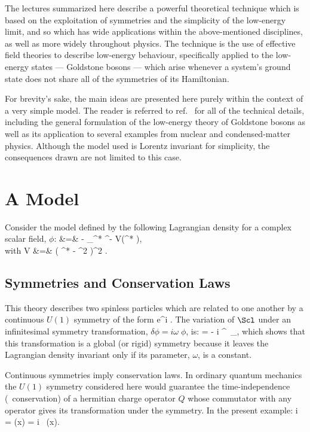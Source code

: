 The lectures summarized here describe a powerful theoretical 
technique which is based on the exploitation of symmetries 
and the simplicity of the low-energy limit, and so which has 
wide applications within the above-mentioned disciplines, as 
well as more widely throughout physics. The technique is the
use of effective field theories to describe low-energy behaviour,
specifically applied to the low-energy states --- Goldstone 
bosons --- which arise whenever a system's ground state
does not share all of the symmetries of its Hamiltonian.

For brevity's sake, the main ideas are presented here purely
within the context of a very simple model. The reader is
referred to ref.~\cite{Burgess98a} for all of the technical
details, including the general formulation of the low-energy
theory of Goldstone bosons as well as its application to
several examples from nuclear and condensed-matter physics. 
Although the model used is Lorentz invariant for simplicity,
the consequences drawn are not limited to this case.

\section{A Model}

Consider the model defined by the following Lagrangian density
for a complex scalar field, $\phi$:
%
\bg
\label{abeltoymodel}
\Scl &=& - \partial_\mu \phi^* \partial^\mu \phi - V(\phi^* \phi), \nn\\
\hbox{with} \qquad V &=& {\lambda {}} \; \left( \phi^* \phi - {\mu^2
\over \lambda} \right)^2 .
\nd

\subsection{Symmetries and Conservation Laws}

This theory describes two spinless particles which are related to
one another by a continuous $U(1)$ symmetry of the form 
%
\bg
\label{U1form}
\phi \to e^{i\omega} \; \phi. 
\nd 
%
The variation of $\Scl$ 
under an infinitesimal symmetry transformation, $\delta \phi
= i \omega \; \phi$,  is:
%
\bg
\label{deltaL}
\delta \Scl = - i \partial^\mu \phi \, \partial_\mu \omega, 
\nd
%
which shows that this transformation is a global
(or rigid) symmetry because it leaves the Lagrangian density 
invariant only if its parameter, $\omega$, is a constant. 

Continuous symmetries imply conservation laws. In ordinary
quantum mechanics the $U(1)$ symmetry considered here
would guarantee the time-independence (\ie\ conservation) 
of a hermitian charge operator $Q$ whose commutator with any operator
gives its transformation under the symmetry. In the present example:
%
\bg
\label{generator}
i \omega {} = \delta \phi(x) = i \omega \, \phi(x).
\nd

